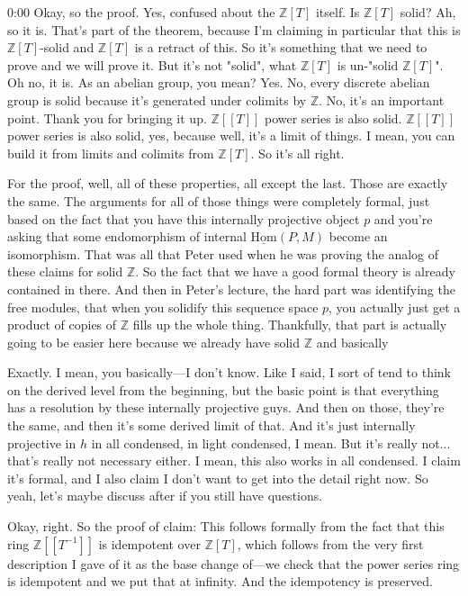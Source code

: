 \begin{unfinished}{0:00}
Okay, so the proof. Yes, confused about the $\mathbb{Z}[T]$ itself. Is $\mathbb{Z}[T]$ solid? Ah, so it is. That's part of the theorem, because I'm claiming in particular that this is $\mathbb{Z}[T]$-solid and $\mathbb{Z}[T]$ is a retract of this. So it's something that we need to prove and we will prove it. But it's not "solid", what $\mathbb{Z}[T]$ is un-"solid $\mathbb{Z}[T]$". Oh no, it is. As an abelian group, you mean? Yes. No, every discrete abelian group is solid because it's generated under colimits by $\mathbb{Z}$. No, it's an important point. Thank you for bringing it up. $\mathbb{Z}[[T]]$ power series is also solid. $\mathbb{Z}[[T]]$ power series is also solid, yes, because well, it's a limit of things. I mean, you can build it from limits and colimits from $\mathbb{Z}[T]$. So it's all right.

For the proof, well, all of these properties, all except the last. Those are exactly the same. The arguments for all of those things were completely formal, just based on the fact that you have this internally projective object $p$ and you're asking that some endomorphism of internal $\underline{\text{Hom}}(P,M)$ become an isomorphism. That was all that Peter used when he was proving the analog of these claims for solid $\mathbb{Z}$. So the fact that we have a good formal theory is already contained in there. And then in Peter's lecture, the hard part was identifying the free modules, that when you solidify this sequence space $p$, you actually just get a product of copies of $\mathbb{Z}$ fills up the whole thing. Thankfully, that part is actually going to be easier here because we already have solid $\mathbb{Z}$ and basically

Exactly. I mean, you basically---I don't know. Like I said, I sort of tend to think on the derived level from the beginning, but the basic point is that everything has a resolution by these internally projective guys. And then on those, they're the same, and then it's some derived limit of that. And it's just internally projective in $h$ in all condensed, in light condensed, I mean. But it's really not... that's really not necessary either. I mean, this also works in all condensed. I claim it's formal, and I also claim I don't want to get into the detail right now. So yeah, let's maybe discuss after if you still have questions.

Okay, right. So the proof of claim: This follows formally from the fact that this ring $\mathbb{Z}[[T^{-1}]]$ is idempotent over $\mathbb{Z}[T]$, which follows from the very first description I gave of it as the base change of---we check that the power series ring is idempotent and we put that at infinity. And the idempotency is preserved.


\end{unfinished}
